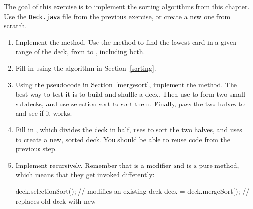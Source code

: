 \begin{exercise}  %

The goal of this exercise is to implement the sorting algorithms from this chapter.
Use the {\tt Deck.java} file from the previous exercise, or create a new one from scratch.


\begin{enumerate}

\item Implement the  method.
Use the  method to find the lowest card in a given range of the deck, from  to , including both.

\item Fill in  using the algorithm in Section~\ref{sorting}.

\item Using the pseudocode in Section~\ref{mergesort}, implement the  method.
The best way to test it is to build and shuffle a deck.
Then use  to form two small subdecks, and use selection sort to sort them.
Finally, pass the two halves to  and see if it works.

\item Fill in , which divides the deck in half, uses  to sort the two halves, and uses  to create a new, sorted deck.
You should be able to reuse code from the previous step.

\item Implement  recursively.
Remember that  is a modifier and  is a pure method, which means that they get invoked differently:

\begin{code}
deck.selectionSort();      // modifies an existing deck
deck = deck.mergeSort();   // replaces old deck with new
\end{code}

\end{enumerate}

\end{exercise}


